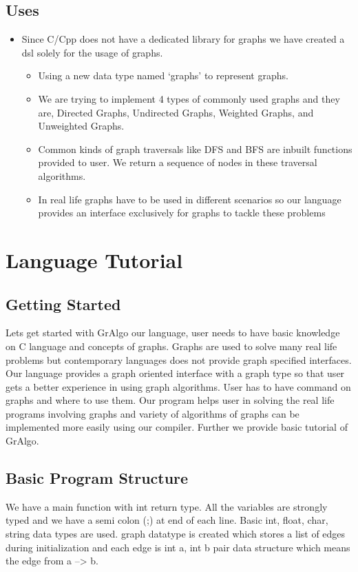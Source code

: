 \documentclass[english,a4paper,12pt]{report}
\begin{document}
\section{Uses}
\begin{itemize}
    \item Since C/Cpp does not have a dedicated library for graphs we have created a dsl solely for the usage of graphs.
    \begin{itemize}
        \item Using a new data type named ‘graphs’ to represent graphs.
        \item We are trying to implement 4 types of commonly used graphs and they are, Directed Graphs, Undirected Graphs, Weighted Graphs, and Unweighted Graphs.
        \item Common kinds of graph traversals like DFS and BFS are inbuilt functions provided to user. We return a sequence of nodes in these traversal algorithms.
        \item In real life graphs have to be used in different scenarios so our 
        language provides an interface exclusively for graphs to tackle these problems

    \end{itemize}
\end{itemize}

\chapter{Language Tutorial}
\section{Getting Started}
Lets get started with GrAlgo our language, user needs to have basic knowledge on C language and concepts
of graphs. Graphs are used to solve many real life problems but contemporary languages does not provide 
graph specified interfaces. Our language provides a graph oriented interface with a graph type so that
user gets a better experience in using graph algorithms. User has to have command on graphs and where to 
use them. Our program helps user in solving the real life programs involving graphs and variety of algorithms 
of graphs can be implemented more easily using our compiler. Further we provide basic tutorial of GrAlgo.

\section{Basic Program Structure}
We have a main function with int return type. All the variables are strongly typed and we have a
semi colon (;) at end of each line. Basic int, float, char, string data types are used.
graph datatype is created which stores a list of edges during initialization
and each edge is int a, int b pair data structure which means the edge from a --> b.
\end{document}
